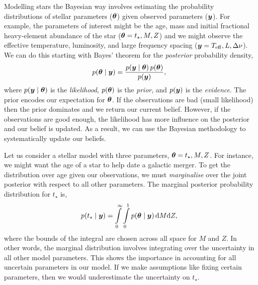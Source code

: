
Modelling stars the Bayesian way involves estimating the probability distributions of stellar parameters (\(\bm{\theta}\)) given observed parameters (\(\bm{y}\)). For example, the parameters of interest might be the age, mass and initial fractional heavy-element abundance of the star (\(\bm{\theta} = t_\star, M, Z\)) and we might observe the effective temperature, luminosity, and large frequency spacing (\(\bm{y} = {T_\mathrm{eff}}, L, \Delta\nu\)). We can do this starting with Bayes' theorem for the \emph{posterior} probability density,
%
\begin{equation}
    p(\bm{\theta} \mid \bm{y}) = \frac{p(\bm{y} \mid \bm{\theta})\,p(\bm{\theta})}{p(\bm{y})},
\end{equation}
%
where \(p(\bm{y} \mid \bm{\theta})\) is the \emph{likelihood}, \(p(\bm{\theta})\) is the \emph{prior}, and \(p(\bm{y})\) is the \emph{evidence}. The prior encodes our expectation for \(\bm{\theta}\). If the observations are bad (small likelihood) then the prior dominates and we return our current belief. However, if the observations are good enough, the likelihood has more influence on the posterior and our belief is updated. As a result, we can use the Bayesian methodology to systematically update our beliefs.

Let us consider a stellar model with three parameters, \(\bm{\theta} = t_\star, M, Z\). For instance, we might want the age of a star to help date a galactic merger. To get the distribution over age given our observations, we must \emph{marginalise} over the joint posterior with respect to all other parameters. The marginal posterior probability distribution for \(t_\star\) is,
%
\begin{equation}
    p(t_\star \mid \bm{y}) = \int\limits_0^\infty \int\limits_0^1 p(\bm{\theta} \mid \bm{y}) \, \mathrm{d} M \mathrm{d} Z,
\end{equation}
%
where the bounds of the integral are chosen across all space for \(M\) and \(Z\). In other words, the marginal distribution involves integrating over the uncertainty in all other model parameters. This shows the importance in accounting for all uncertain parameters in our model. If we make assumptions like fixing certain parameters, then we would underestimate the uncertainty on \(t_\star\).

